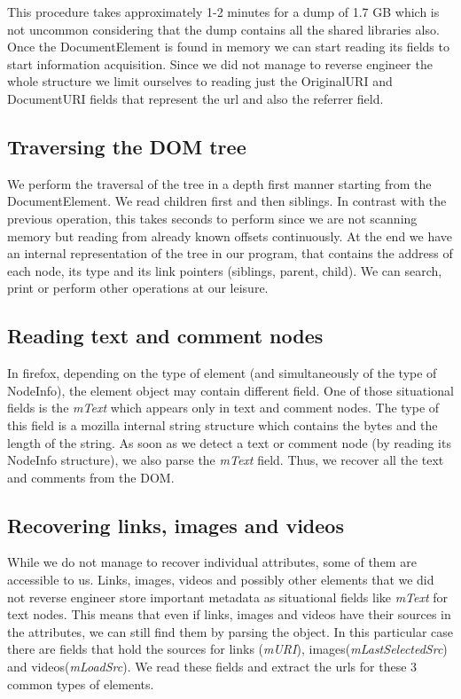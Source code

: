 This procedure takes approximately 1-2 minutes for a dump of 1.7 GB which is not uncommon considering that the dump contains all the shared libraries also. Once the DocumentElement is found in memory we can start reading its fields to start information acquisition. Since we did not manage to reverse engineer the whole structure we limit ourselves to reading just the OriginalURI and DocumentURI fields that represent the url and also the referrer field.

\subsection{Traversing the DOM tree}
We perform the traversal of the tree in a depth first manner starting from the DocumentElement. We read children first and then siblings. In contrast with the previous operation, this takes seconds to perform since we are not scanning memory but reading from already known offsets continuously. At the end we have an internal representation of the tree in our program, that contains the address of each node, its type and its link pointers (siblings, parent, child). We can search, print or perform other operations at our leisure.

\subsection{Reading text and comment nodes}
In firefox, depending on the type of element (and simultaneously of the type of NodeInfo), the element object may contain different field. One of those situational fields is the \textit{mText} which appears only in text and comment nodes. The type of this field is a mozilla internal string structure which contains the bytes and the length of the string. As soon as we detect a text or comment node (by reading its NodeInfo structure), we also parse the \textit{mText} field. Thus, we recover all the text and comments from the DOM.

\subsection{Recovering links, images and videos}
While we do not manage to recover individual attributes, some of them are accessible to us. Links, images, videos and possibly other elements that we did not reverse engineer store important metadata as situational fields like \textit{mText} for text nodes. This means that even if links, images and videos have their sources in the attributes, we can still find them by parsing the object. In this particular case there are fields that hold the sources for links (\textit{mURI}), images(\textit{mLastSelectedSrc}) and videos(\textit{mLoadSrc}). We read these fields and extract the urls for these 3 common types of elements.

